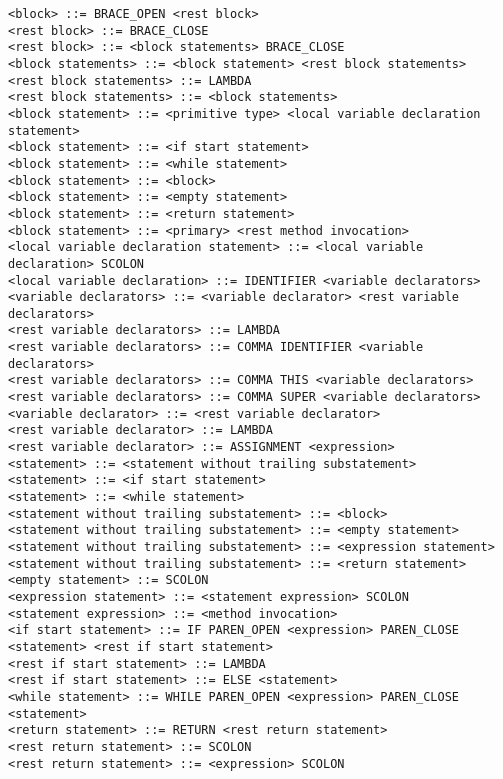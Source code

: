 \documentclass [a4paper,abstracton,titlepage]{scrartcl}
\begin{document}
\begin{lstlisting}<block> ::= BRACE_OPEN <rest block>
<rest block> ::= BRACE_CLOSE
<rest block> ::= <block statements> BRACE_CLOSE
<block statements> ::= <block statement> <rest block statements>
<rest block statements> ::= LAMBDA
<rest block statements> ::= <block statements>
<block statement> ::= <primitive type> <local variable declaration statement>
<block statement> ::= <if start statement>
<block statement> ::= <while statement>
<block statement> ::= <block>
<block statement> ::= <empty statement>
<block statement> ::= <return statement>
<block statement> ::= <primary> <rest method invocation>
<local variable declaration statement> ::= <local variable declaration> SCOLON
<local variable declaration> ::= IDENTIFIER <variable declarators>
<variable declarators> ::= <variable declarator> <rest variable declarators>
<rest variable declarators> ::= LAMBDA
<rest variable declarators> ::= COMMA IDENTIFIER <variable declarators>
<rest variable declarators> ::= COMMA THIS <variable declarators>
<rest variable declarators> ::= COMMA SUPER <variable declarators>
<variable declarator> ::= <rest variable declarator>
<rest variable declarator> ::= LAMBDA
<rest variable declarator> ::= ASSIGNMENT <expression>
<statement> ::= <statement without trailing substatement>
<statement> ::= <if start statement>
<statement> ::= <while statement>
<statement without trailing substatement> ::= <block>
<statement without trailing substatement> ::= <empty statement>
<statement without trailing substatement> ::= <expression statement>
<statement without trailing substatement> ::= <return statement>
<empty statement> ::= SCOLON
<expression statement> ::= <statement expression> SCOLON
<statement expression> ::= <method invocation>
<if start statement> ::= IF PAREN_OPEN <expression> PAREN_CLOSE <statement> <rest if start statement>
<rest if start statement> ::= LAMBDA
<rest if start statement> ::= ELSE <statement>
<while statement> ::= WHILE PAREN_OPEN <expression> PAREN_CLOSE <statement>
<return statement> ::= RETURN <rest return statement>
<rest return statement> ::= SCOLON
<rest return statement> ::= <expression> SCOLON\end{lstlisting}
\end{document}
